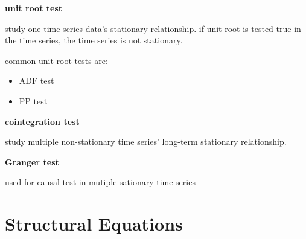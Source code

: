 \documentclass{article}
\providecommand{\tightlist}{
  \setlength{\itemsep}{0pt}
  \setlength{\parskip}{0pt}}
\begin{document}
\textbf{unit root test}

study one time series data's stationary relationship. if unit root is tested true in the time series, the time series is not stationary.

common unit root tests are:
\begin{itemize}
\tightlist
  \item ADF test
  \item PP test
\end{itemize}

\textbf{cointegration test}

study multiple non-stationary time series' long-term stationary relationship.

\textbf{Granger test}

used for causal test in mutiple sationary time series


\section{Structural Equations}
\end{document}
